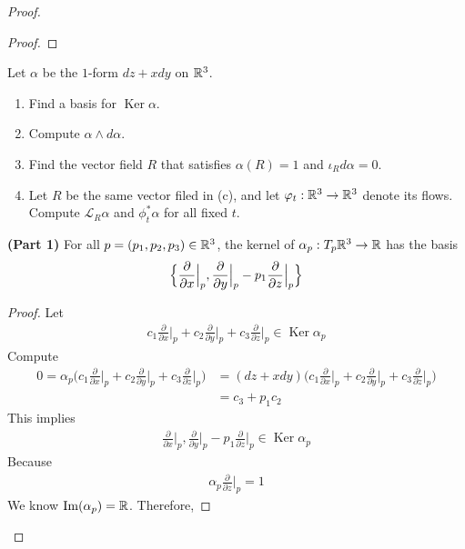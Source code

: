 \documentclass{report}
\begin{document}
\begin{proof}
\begin{proof}
\end{proof}
\begin{question}{}{}
Let $\alpha $ be the $1$-form  $dz+xdy$  on  $\mathbb{R}^3$. 
 \begin{enumerate}[label=(\alph*)]
  \item Find a basis for $\operatorname{Ker}\alpha $. 
  \item Compute $\alpha \wedge  d\alpha  $. 
  \item Find the vector field  $R$ that satisfies  $\alpha (R)=1$ and $\iota_R d\alpha =0$.
  \item Let $R$ be the same vector filed in  (c), and let  $\varphi_t:\mathbb{R}^3 \rightarrow \mathbb{R}^3$ denote its flows. Compute $\mathcal{L}_R\alpha $ and $\phi_t^*\alpha  $ for all fixed $t$.  
\end{enumerate}
\end{question}
\begin{theorem}
\textbf{(Part 1)} For all $p=(p_1,p_2,p_3)\in \mathbb{R}^3$, the kernel of $\alpha _{p}:T_p\mathbb{R}^3 \rightarrow \mathbb{R}$ has the basis 
\begin{align*}
\Big\{ \frac{\partial }{\partial x}\Big|_{p}, \frac{\partial }{\partial y}\Big|_{p}-p_1 \frac{\partial }{\partial z}\Big|_{p} \Big\}
\end{align*}
\end{theorem}
\begin{proof}
Let 
\begin{align*}
 c_1\frac{\partial }{\partial x}\Big|_{p}+c_2 \frac{\partial }{\partial y}\Big|_{p}+ c_3\frac{\partial }{\partial z}\Big|_{p} \in \operatorname{Ker}\alpha _p
\end{align*}
Compute 
\begin{align*}
0=\alpha_p\Big( c_1\frac{\partial }{\partial x}\Big|_{p}+c_2 \frac{\partial }{\partial y}\Big|_{p}+ c_3\frac{\partial }{\partial z}\Big|_{p}  \Big)&=  (dz+xdy) \Big( c_1\frac{\partial }{\partial x}\Big|_{p}+c_2 \frac{\partial }{\partial y}\Big|_{p}+ c_3\frac{\partial }{\partial z}\Big|_{p}  \Big) \\
&= c_3 + p_1 c_2
\end{align*}
This implies 
\begin{align*}
\frac{\partial }{\partial x}\Big|_{p}, \frac{\partial }{\partial y}\Big|_{p}-p_1 \frac{\partial }{\partial z}\Big|_{p} \in \operatorname{Ker}\alpha_p
\end{align*}
Because 
\begin{align*}
\alpha_p \frac{\partial }{\partial z}\Big|_p =1
\end{align*}
We know $\operatorname{Im}(\alpha_p)=\mathbb{R}$. Therefore, 

\end{proof}
\end{proof}
\end{document}
